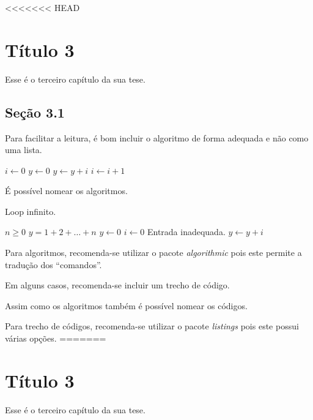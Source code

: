 <<<<<<< HEAD
\chapter{Título 3}
Esse é o terceiro capítulo da sua tese.

\section{Seção 3.1}
Para facilitar a leitura, é bom incluir o algoritmo de forma adequada e não
como uma lista.
\begin{algorithmic}[2]
    \STATE $i \leftarrow 0$
    \STATE $y \leftarrow 0$
        \STATE $y \leftarrow y + i$
        \STATE $i \leftarrow i + 1$
    \ENDFOR
\end{algorithmic}

\'E poss\'ivel nomear os algoritmos.
\begin{algorithm}
    \caption{Loop infinito.}
    \label{alg:loop_inf}
    \begin{algorithmic}
        \REQUIRE $n \geq 0$
        \ENSURE $y = 1 + 2 + \ldots + n$
        \STATE $y \leftarrow 0$
        \STATE $i \leftarrow 0$
            \PRINT Entrada inadequada.
        \ELSE
                \STATE $y \leftarrow y + i$
            \ENDWHILE
        \ENDIF
    \end{algorithmic}
\end{algorithm}

Para algoritmos, recomenda-se utilizar o pacote
\emph{algorithmic} pois este
permite a tradu\c{c}\~ao dos ``comandos''.

Em alguns casos, recomenda-se incluir um trecho de
código.


Assim como os algoritmos tamb\'em \'e poss\'ivel nomear os c\'odigos.


Para trecho de códigos,  recomenda-se utilizar o pacote
\emph{listings} pois
este possui várias opções.
=======
\chapter{Título 3}
Esse é o terceiro capítulo da sua tese.

